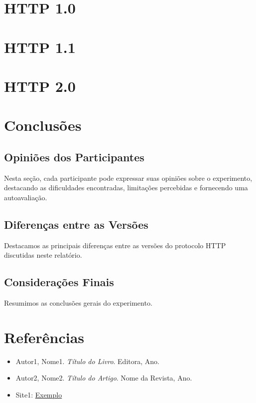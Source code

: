 \documentclass{article}
\begin{document}
\section{HTTP 1.0}

\section{HTTP 1.1}

\section{HTTP 2.0}

\section{Conclusões}
\subsection{Opiniões dos Participantes}
Nesta seção, cada participante pode expressar suas opiniões sobre o
experimento, destacando as dificuldades encontradas, limitações percebidas e
fornecendo uma autoavaliação.

\subsection{Diferenças entre as Versões}
Destacamos as principais diferenças entre as versões do protocolo HTTP
discutidas neste relatório.

\subsection{Considerações Finais}
Resumimos as conclusões gerais do experimento.

\section{Referências}
\begin{itemize}

    https://developer.mozilla.org/en-US/docs/Web/HTTP/Basics_of_HTTP/Evolution_of_HTTP
    https://www.baeldung.com/cs/http-versions
    https://www.w3.org/Protocols/History.html
    https://www.ibm.com/docs/en/cics-ts/5.3?topic=concepts-http-protocol
    http://www.tcpipguide.com/free/t_HTTPOverviewHistoryVersionsandStandards.htm


    \item Autor1, Nome1. \textit{Título do Livro}. Editora, Ano.
    \item Autor2, Nome2. \textit{Título do Artigo}. Nome da Revista, Ano.
    \item Site1: \href{http://www.exemplo.com}{Exemplo}
\end{itemize}
\end{document}
